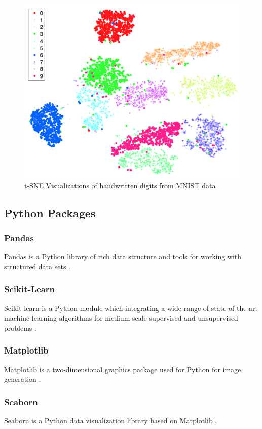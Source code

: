 \documentclass[a4paper]{article}
\begin{document}
            \begin{figure}[p]
                \centering
                \includegraphics[width=0.5 \linewidth]{figures/tsne.png}
                \caption{t-SNE Visualizations of handwritten digits from MNIST data \protect \cite{tsne1}}
                \label{fig:tsne}
            \end{figure}

        \subsection{Python Packages}
            \subsubsection{Pandas}
                Pandas is a Python library of rich data structure and tools for working with structured data sets \cite{pandas1}.

            \subsubsection{Scikit-Learn}
                Scikit-learn is a Python module which integrating a wide range of state-of-the-art machine learning algorithms for medium-scale supervised and unsupervised problems \cite{sklearn1}.

            \subsubsection{Matplotlib}
                Matplotlib is a two-dimensional graphics package used for Python for image generation \cite{matplotlib1}.

            \subsubsection{Seaborn}
                Seaborn is a Python data visualization library based on Matplotlib \cite{seaborn1}.
\end{document}
